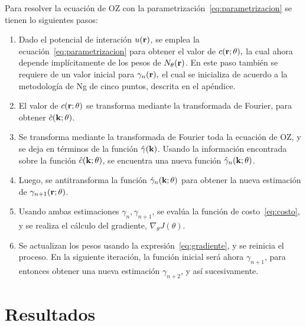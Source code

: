 Para resolver la ecuación de OZ con la parametrización~\eqref{eq:parametrizacion} se tienen lo siguientes pasos:

\begin{enumerate}
    \item Dado el potencial de interación $u(\mathbf{r})$, se emplea la ecuación~\eqref{eq:parametrizacion} para obtener el valor de $c(\mathbf{r}; \theta),$ la cual ahora depende implícitamente de los pesos de $N_{\theta}(\mathbf{r})$. En este paso también se requiere de un valor inicial para $\gamma_{n}(\mathbf{r}),$ el cual se inicializa de acuerdo a la metodología de Ng de cinco puntos, descrita en el apéndice. %
    \item El valor de $c(\mathbf{r}; \theta)$ se transforma mediante la transformada de Fourier, para obtener $\hat{c}(\mathbf{k}; \theta)$.
    \item Se transforma mediante la transformada de Fourier toda la ecuación de OZ, y se deja en términos de la función $\hat{\gamma}(\mathbf{k})$. Usando la información encontrada sobre la función $\hat{c}(\mathbf{k}; \theta)$, se encuentra una nueva función $\hat{\gamma}_{n}(\mathbf{k}; \theta)$.
    \item Luego, se antitransforma la función $\hat{\gamma}_{n}(\mathbf{k}; \theta)$ para obtener la nueva estimación de $\gamma_{n+1}(\mathbf{r}; \theta)$.
    \item Usando ambas estimaciones $\gamma_{n}, \gamma_{n+1}$, se evalúa la función de costo~\eqref{eq:costo}, y se realiza el cálculo del gradiente, $\nabla_{\theta} J(\theta)$.
    \item Se actualizan los pesos usando la expresión~\eqref{eq:gradiente}, y se reinicia el proceso. En la siguiente iteración, la función inicial será ahora $\gamma_{n+1}$, para entonces obtener una nueva estimación $\gamma_{n+2}$, y así sucesivamente.
\end{enumerate}


\section{Resultados}

